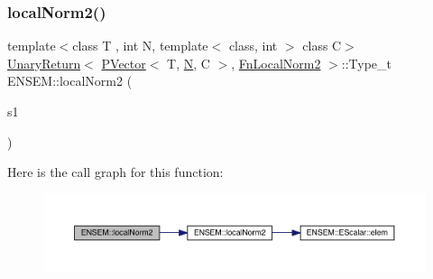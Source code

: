 \subsubsection{\texorpdfstring{localNorm2()}{localNorm2()}}
{\footnotesize\ttfamily template$<$class T , int N, template$<$ class, int $>$ class C$>$ \\
\mbox{\hyperlink{structENSEM_1_1UnaryReturn}{Unary\+Return}}$<$ \mbox{\hyperlink{classENSEM_1_1PVector}{P\+Vector}}$<$ T, \mbox{\hyperlink{operator__name__util_8cc_a7722c8ecbb62d99aee7ce68b1752f337}{N}}, C $>$, \mbox{\hyperlink{structENSEM_1_1FnLocalNorm2}{Fn\+Local\+Norm2}} $>$\+::Type\+\_\+t E\+N\+S\+E\+M\+::local\+Norm2 (\begin{DoxyParamCaption}\item[{const \mbox{\hyperlink{classENSEM_1_1PVector}{P\+Vector}}$<$ T, \mbox{\hyperlink{operator__name__util_8cc_a7722c8ecbb62d99aee7ce68b1752f337}{N}}, C $>$ \&}]{s1 }\end{DoxyParamCaption})\hspace{0.3cm}{\ttfamily [inline]}}

Here is the call graph for this function\+:\nopagebreak
\begin{figure}[H]
\begin{center}
\leavevmode
\includegraphics[width=350pt]{d3/dc4/group__primvector_ga50edf2bff5393989dac9f89e511257be_cgraph}
\end{center}
\end{figure}
\mbox{\label{group__primvector_gab03f792e64e0e2073c0ab9f04fa4518f}} 
